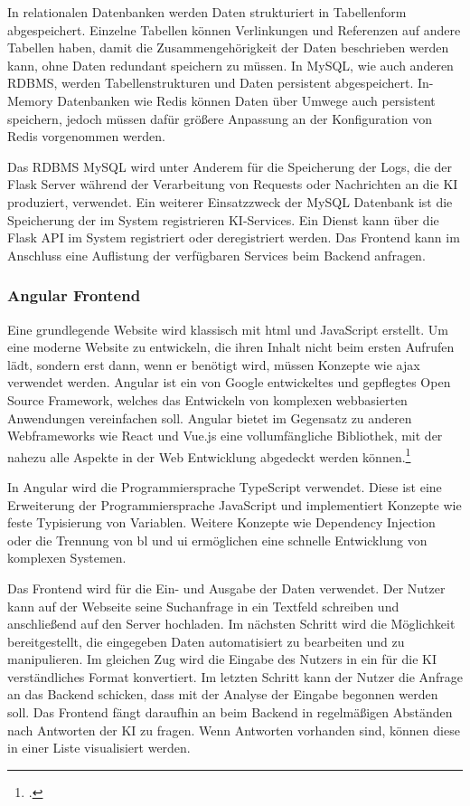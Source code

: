 In relationalen Datenbanken werden Daten strukturiert in Tabellenform abgespeichert. Einzelne Tabellen können Verlinkungen und Referenzen auf andere Tabellen haben, damit die Zusammengehörigkeit der Daten beschrieben werden kann, ohne Daten redundant speichern zu müssen. In MySQL, wie auch anderen RDBMS, werden Tabellenstrukturen und Daten persistent abgespeichert. In-Memory Datenbanken wie Redis können Daten über Umwege auch persistent speichern, jedoch müssen dafür größere Anpassung an der Konfiguration von Redis vorgenommen werden.

Das RDBMS MySQL wird unter Anderem für die Speicherung der Logs, die der Flask Server während der Verarbeitung von Requests oder Nachrichten an die KI produziert, verwendet. Ein weiterer Einsatzzweck der MySQL Datenbank ist die Speicherung der im System registrieren KI-Services. Ein Dienst kann über die Flask API im System registriert oder deregistriert werden. Das Frontend kann im Anschluss eine Auflistung der verfügbaren Services beim Backend anfragen.

\subsubsection{Angular Frontend}
Eine grundlegende Website wird klassisch mit \ac{html} und JavaScript erstellt. Um eine moderne Website zu entwickeln, die ihren Inhalt nicht beim ersten Aufrufen lädt, sondern erst dann, wenn er benötigt wird, müssen Konzepte wie \ac{ajax} verwendet werden. Angular ist ein von Google entwickeltes und gepflegtes Open Source Framework, welches das Entwickeln von komplexen webbasierten Anwendungen vereinfachen soll. Angular bietet im Gegensatz zu anderen Webframeworks wie React und Vue.js eine vollumfängliche Bibliothek, mit der nahezu alle Aspekte in der Web Entwicklung abgedeckt werden können.\footcite{moiseev2018angular}

In Angular wird die Programmiersprache TypeScript verwendet. Diese ist eine Erweiterung der Programmiersprache JavaScript und implementiert Konzepte wie feste Typisierung von Variablen. Weitere Konzepte wie Dependency Injection oder die Trennung von \ac{bl} und \ac{ui} ermöglichen eine schnelle Entwicklung von komplexen Systemen. 

Das Frontend wird für die Ein- und Ausgabe der Daten verwendet. Der Nutzer kann auf der Webseite seine Suchanfrage in ein Textfeld schreiben und anschließend auf den Server hochladen. Im nächsten Schritt wird die Möglichkeit bereitgestellt, die eingegeben Daten automatisiert zu bearbeiten und zu manipulieren. Im gleichen Zug wird die Eingabe des Nutzers in ein für die KI verständliches Format konvertiert. Im letzten Schritt kann der Nutzer die Anfrage an das Backend schicken, dass mit der Analyse der Eingabe begonnen werden soll. Das Frontend fängt daraufhin an beim Backend in regelmäßigen Abständen nach Antworten der KI zu fragen. Wenn Antworten vorhanden sind, können diese in einer Liste visualisiert werden.



